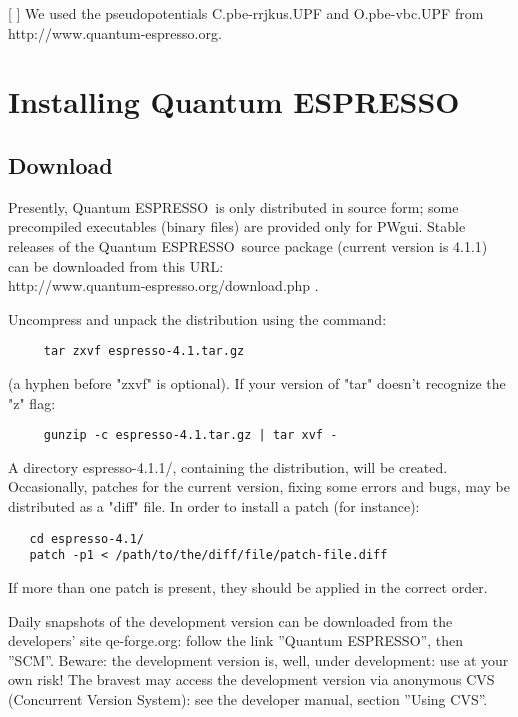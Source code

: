 \documentclass[12pt,a4paper]{article}
\def\version{4.1.1}
\def\qe{{\sc Quantum ESPRESSO}}
\begin{document}
[ ] We used the pseudopotentials C.pbe-rrjkus.UPF
and O.pbe-vbc.UPF from http://www.quantum-espresso.org.

\section{Installing \qe}

\subsection{Download}
 
Presently, \qe\ is only distributed in source form; 
some precompiled executables (binary files) are provided only for PWgui. 
Stable releases of the \qe\ source package (current version 
is \version) can be downloaded from this URL: \\
http://www.quantum-espresso.org/download.php .

Uncompress and unpack the distribution using the command:
\begin{verbatim}
     tar zxvf espresso-4.1.tar.gz
\end{verbatim}
(a hyphen before "zxvf" is optional). If your version of "tar" 
doesn't recognize the "z" flag:
\begin{verbatim}
     gunzip -c espresso-4.1.tar.gz | tar xvf -
\end{verbatim}
A directory espresso-\version/, containing the distribution, will be created. 
Occasionally, patches for the current version, fixing some errors and bugs,
may be distributed as a "diff" file. In order to install a patch (for instance):\begin{verbatim}
   cd espresso-4.1/
   patch -p1 < /path/to/the/diff/file/patch-file.diff
\end{verbatim}

If more than one patch is present, they should be applied in the correct order.

Daily snapshots of the development version can be downloaded from the
developers' site qe-forge.org: follow the link ''Quantum ESPRESSO'',
then ''SCM''. Beware: the development version is, well, under
development: use at your own risk! The bravest may access the 
development version via anonymous CVS 
(Concurrent Version System): see the developer manual, section
''Using CVS''.
\end{document}
